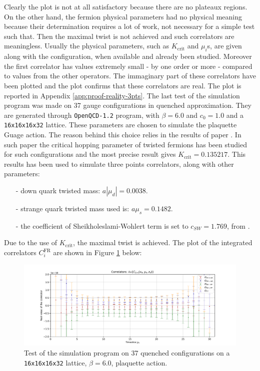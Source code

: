 \documentclass[english, LaM, oneside, noexaminfo]{sapthesis}
\begin{document}
\newline
Clearly the plot is not at all satisfactory because there are no plateaux regions.
On the other hand, the fermion physical parameters had no physical meaning because their determination requires a lot of work, not necessary for a simple test such that.
Then the maximal twist is not achieved and such correlators are meaningless.
Usually the physical parameters, such as $K_\text{crit}$ and $\mu_i$s, are given along with the configuration, when available and already been studied.
Moreover the first correlator has values extremely small - by one order or more - compared to values from the other operators.
The immaginary part of these correlators have been plotted and the plot confirms that these correlators are real.
The plot is reported in Appendix \ref{app:proof-reality-3pts}.
\newline
The last test of the simulation program was made on 37 gauge configurations in quenched approximation.
They are generated through \texttt{OpenQCD-1.2} program, with $\beta=6.0$ and $c_0 = 1.0$ and a \texttt{16x16x16x32} lattice.
These parameters are chosen to simulate the plaquette Guage action.
The reason behind this choice relies in the results of paper \cite{exploring-tmQCD-clover-term}.
In such paper the critical hopping parameter of twisted fermions has been studied for such configurations and the most precise result gives $K_\text{crit} = 0.135217$.
This results has been used to simulate three points correlators, along with other parameters:
\begin{itemize}
    \item [-] down quark twisted mass: $a|\mu_d| = 0.0038$.
    \item [-] strange quark twisted mass used is: $a\mu_s = 0.1482$.
    \item [-] the coefficient of Sheikholeslami-Wohlert term is set to $c_{SW}=1.769$, from \cite{Luscher-cSW}.
\end{itemize}
Due to the use of $K_\text{crit}$, the maximal twist is achieved.
The plot of the integrated correlators $C_i^\text{FR}$ are shown in Figure \ref{fig:plaq-ym} below:
\begin{figure}[!h]
    \centering
    \includegraphics[width=\textwidth]{imgs-MSc-thesis/plaqAct-3pts.pdf}
    \caption{Test of the simulation program on 37 quenched configurations on a \texttt{16x16x16x32} lattice, $\beta = 6.0$, plaquette action.}
    \label{fig:plaq-ym}
\end{figure}
\end{document}

